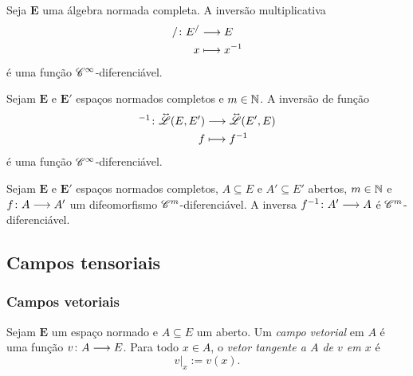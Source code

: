 \begin{proposition}
Seja $\bm E$ uma álgebra normada completa. A inversão multiplicativa
	\begin{align*}
	{/}\colon {E^{/}} &\longrightarrow {E} \\{x} &\longmapsto x^{-1}
	\end{align*}
é uma função $\mathscr{C}^\infty$-diferenciável.
\end{proposition}

\begin{proposition}
Sejam $\bm E$ e $\bm E'$ espaços normados completos e $m \in \mathbb{N}$. A inversão de função
	\begin{align*}
	{^{-1}}\colon {\accentset{\leftrightarrow\ }{\mathscr{L}}(E,E')} &\longrightarrow {\accentset{\leftrightarrow\ }{\mathscr{L}}(E',E)} \\{f} &\longmapsto f^{-1}
	\end{align*}
é uma função $\mathscr{C}^\infty$-diferenciável.
\end{proposition}


\begin{proposition}
Sejam $\bm E$ e $\bm E'$ espaços normados completos, $A \subseteq E$ e $A' \subseteq E'$ abertos, $m \in \mathbb{N}$ e ${f}\colon {A} \longrightarrow {A'}$ um difeomorfismo $\mathscr{C}^m$-diferenciável. A inversa ${f^{-1}}\colon {A'} \longrightarrow {A}$ é $\mathscr{C}^m$-diferenciável.
\end{proposition}













\cleardoublepage




\subsection{Campos tensoriais}

\subsubsection{Campos vetoriais}

\begin{definition}
Sejam $\bm E$ um espaço normado e $A \subseteq E$ um aberto. Um \emph{campo vetorial} em $A$ é uma função ${v}\colon {A} \longrightarrow {E}$. Para todo $x \in A$, o \emph{vetor tangente a $A$ de $v$ em $x$} é
	\begin{equation*}
	v|_x := v(x).
	\end{equation*}
\end{definition}

